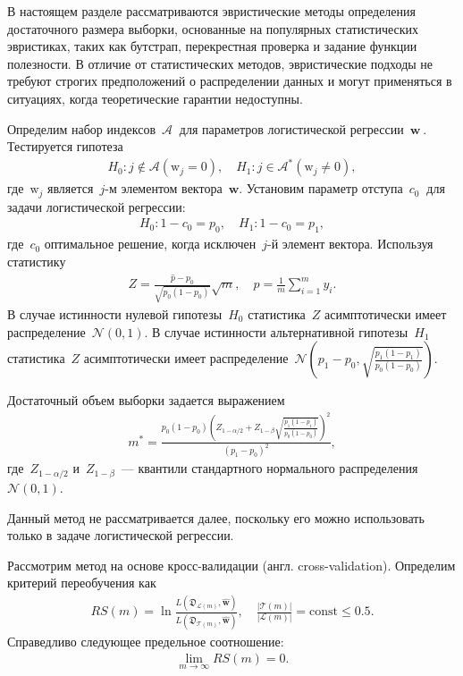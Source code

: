 В настоящем разделе рассматриваются эвристические методы определения достаточного размера выборки, основанные на популярных статистических эвристиках, таких как бутстрап, перекрестная проверка и задание функции полезности. В отличие от статистических методов, эвристические подходы не требуют строгих предположений о распределении данных и могут применяться в ситуациях, когда теоретические гарантии недоступны.

Определим набор индексов~$\mathcal {A}~$ для параметров логистической регрессии~$\textbf {w}~$. Тестируется гипотеза
\[
\label{eq:hb:1}
\begin{aligned}
	H_0: j \not\in\mathcal{A} \left(\text{w}_{j} = 0\right), \quad H_1: j \in \mathcal{A}^* \left(\text{w}_{j} \not= 0\right),
\end{aligned}
\]
где~$\text{w}_{j}$ является~$j$-м элементом вектора~$\textbf{w}$.
Установим параметр отступа~$ c_0~$ для задачи логистической регрессии:
\[
\label{eq:hb:2}
\begin{aligned}
	H_0: 1-c_0 = p_0, \quad H_1: 1-c_0 = p_1,
\end{aligned}
\]
где~$c_0$ оптимальное решение, когда исключен~$j$-й элемент вектора.
Используя статистику
\[
\label{eq:hb:3}
\begin{aligned}
	Z = \frac{\hat{p}-p_0}{\sqrt{p_0(1-p_0)}}\sqrt{m}, \quad \hat{p} = \frac{1}{m}\sum_{i=1}^{m}y_i.
\end{aligned}
\]
В случае истинности нулевой гипотезы~$H_0$ статистика~$Z$ асимптотически имеет распределение~$\mathcal{N}\left(0, 1\right)$. В случае истинности альтернативной гипотезы~$H_1$ статистика~$Z$  асимптотически имеет распределение~$ \mathcal{N}\left(p_1-p_0, \sqrt{\frac{p_1(1-p_1)}{p_0(1-p_0)}}\right)$.

Достаточный объем выборки задается выражением
\[
\label{eq:hb:4}
\begin{aligned}
	m^* = \frac{p_0(1-p_0)\left(Z_{1-\alpha/2} + Z_{1-\beta}\sqrt{\frac{p_1(1-p_1)}{p_0(1-p_0)}}\right)^2}{(p_1-p_0)^2},
\end{aligned}
\]
где~$Z_{1-\alpha/2}$ и~$Z_{1-\beta}$~--- квантили стандартного нормального распределения~$\mathcal{N}\left(0, 1\right)$.

Данный метод не рассматривается далее, поскольку его можно использовать только в задаче логистической регрессии.

Рассмотрим метод на основе кросс-валидации (англ. cross-validation). Определим критерий переобучения как
\[
\label{eq:hb:5}
\begin{aligned}
	RS(m) = \ln\frac{L(\mathfrak{D}_{\mathcal{L}(m)}, \hat{\textbf{w}})}{L(\mathfrak{D}_{\mathcal{T}(m)}, \hat{\textbf{w}})}, \quad \frac{|\mathcal{T}(m)|}{|\mathcal{L}(m)|} = \text{const} \leq 0.5.
\end{aligned}
\]
Справедливо следующее предельное соотношение:
\[
\label{eq:hb:6}
\begin{aligned}
	\lim_{m\to \infty}RS(m) = 0.
\end{aligned}
\]

